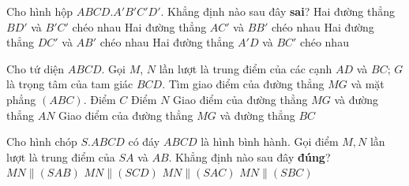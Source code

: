 \begin{ex}%
	Cho hình hộp $ABCD.A'B'C'D'$. Khẳng định nào sau đây \textbf{sai}?
	\choice 
	{Hai đường thẳng $BD'$ và $B'C'$ chéo nhau}
	{Hai đường thẳng $AC'$ và $BB'$ chéo nhau}
	{\True Hai đường thẳng $DC'$ và $AB'$ chéo nhau}
	{Hai đường thẳng $A'D$ và $BC'$ chéo nhau}
\end{ex}

\begin{ex}%
	Cho tứ diện $ABCD$. Gọi $M$, $N$ lần lượt là trung điểm của các cạnh $AD$ và $BC$; $G$ là trọng tâm của tam giác $BCD$. Tìm giao điểm của đường thẳng $MG$ và mặt phẳng $\left(ABC\right)$.
	\choice
	{Điểm $C$}
	{Điểm $N$}
	{\True Giao điểm của đường thẳng $MG$ và đường thẳng $AN$}
	{Giao điểm của đường thẳng $MG$ và đường thẳng $BC$}
\end{ex}

\begin{ex}%
	Cho hình chóp $ S.ABCD $ có đáy $ABCD$ là hình bình hành. Gọi điểm $M,N$ lần lượt là trung điểm của $SA$ và $AB$. Khẳng định nào sau đây \textbf{đúng}?
	\choice
	{$MN \parallel (SAB)$}
	{$MN \parallel (SCD)$}
	{$MN \parallel (SAC)$}
	{\True $MN \parallel (SBC)$}
\end{ex}

